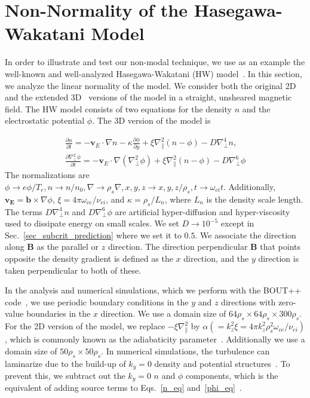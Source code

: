\documentclass[letter,scriptaddress,twocolumn, prl,showkeys]{revtex4}
\def\beqar{\begin{eqnarray}}
\def\eeqar{\end{eqnarray}}
\newcommand{\pdiff}[2]{\frac{\partial#1}{\partial#2}}
\def\grad{\nabla}
\newcommand{\gradpar}{\grad_\parallel}
\newcommand{\gradperp}{\grad_\perp}
\begin{document}
\section{Non-Normality of the Hasegawa-Wakatani Model}
\label{sec_hw_model}

In order to illustrate and test our non-modal technique, we use as an example the well-known and well-analyzed Hasegawa-Wakatani (HW) model~\cite{hasegawa1983}.
In this section, we analyze the linear normality of the model.
We consider both the original 2D and the extended 3D~\cite{biskamp1995} versions of the model in a straight, unsheared magnetic field. 
The HW model consists of two equations for the density $n$ and the electrostatic potential $\phi$. The 3D version of the model is

\beqar
\label{n_eq}
\pdiff{n}{t} = - {\mathbf v_E} \cdot \grad n - \kappa \pdiff{\phi}{y} + \xi \gradpar^2 (n - \phi) - D \gradperp^4 n, \\
\label{phi_eq}
\pdiff{\gradperp^2 \phi}{t} = - {\mathbf v_E} \cdot \grad (\gradperp^2 \phi) + \xi \gradpar^2 (n - \phi) - D \gradperp^6 \phi
\eeqar
The normalizations are $\phi \to e \phi/T_e, n \to n/n_0, \grad \to \rho_s \grad , x,y,z \to x,y,z/\rho_s, t \to \omega_{ci} t $. Additionally,
$\mathbf{v_E} = \mathbf{b} \times \grad \phi$, $\xi = 4 \pi \omega_{ce}/\nu_{ei}$, 
and $\kappa = \rho_s/L_n$, where $L_n$ is the density scale length. The terms $D \gradperp^4 n$ and $D \gradperp^6 \phi$ are artificial hyper-diffusion and hyper-viscosity used to dissipate
energy on small scales. We set $D \to 10^{-5}$ except in Sec.~\ref{sec_subcrit_prediction} where we set it to $0.5$.
We associate the direction along $\mathbf{B}$ as the parallel or $z$ direction. The direction perpendicular $\mathbf{B}$ that
points opposite the density gradient is defined as the $x$ direction, and the $y$ direction is taken perpendicular to both of these.

In the analysis and numerical simulations, which we perform with the BOUT++ code~\cite{dudson2009}, we use periodic boundary conditions in
the $y$ and $z$ directions with zero-value boundaries in the $x$ direction. We use a domain size of $64 \rho_s \times 64 \rho_s \times 300 \rho_s$.
For the 2D version of the model, we replace $-\xi \gradpar^2$ by $\alpha (= k_z^2 \xi = 4 \pi k_z^2 \rho_s^2 \omega_{ce} /\nu_{ei})$, 
which is commonly known as the adiabaticity parameter~\cite{camargo1995,camargo1998}. Additionally we use a domain size of $50 \rho_s \times 50 \rho_s$.
In numerical simulations, the turbulence can laminarize due to the build-up of $k_y=0$ density and potential structures~\cite{biskamp1995}. To prevent this, we subtract out the $k_y=0$
$n$ and $\phi$ components, which is the equivalent of adding source terms to Eqs.~\ref{n_eq} and~\ref{phi_eq}~\cite{friedman2012b}.
\end{document}
